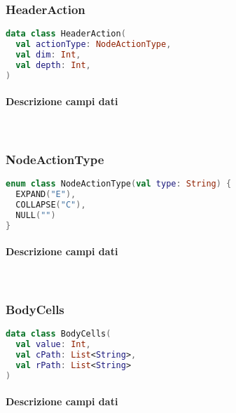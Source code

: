 \subsubsection{HeaderAction}
\begin{lstlisting}[caption={HeaderAction}, label={lst:headeraction}, language=Kotlin]
data class HeaderAction(
  val actionType: NodeActionType,
  val dim: Int,
  val depth: Int,
)
\end{lstlisting}
\paragraph{Descrizione campi dati} \mbox{} \\


\subsubsection{NodeActionType}
\begin{lstlisting}[caption={NodeActionType}, label={lst:nodeactiontype}, language=Kotlin]
enum class NodeActionType(val type: String) {
  EXPAND("E"),
  COLLAPSE("C"),
  NULL("")
}
\end{lstlisting}
\paragraph{Descrizione campi dati} \mbox{} \\

\subsubsection{BodyCells}
\begin{lstlisting}[caption={BodyCells}, label={lst:bodycells}, language=Kotlin]
data class BodyCells(
  val value: Int,
  val cPath: List<String>,
  val rPath: List<String>
)
\end{lstlisting}
\paragraph{Descrizione campi dati} \mbox{} \\

